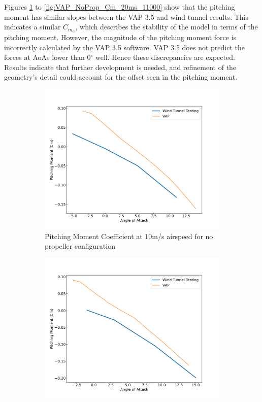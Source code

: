 Figures \ref{fig:VAP_NoProp_Cm_10ms_6000} to \ref{fig:VAP_NoProp_Cm_20ms_11000} show that the pitching moment has similar slopes between the VAP 3.5 and wind tunnel results. This indicates a similar $C_{m_{\alpha}}$, which describes the stability of the model in terms of the pitching moment. However, the magnitude of the pitching moment force is incorrectly calculated by the VAP 3.5 software. VAP 3.5 does not predict the forces at \acrshort{AoA}s lower than 0$^\circ$ well. Hence these discrepancies are expected. Results indicate that further development is needed, and refinement of the geometry's detail could account for the offset seen in the pitching moment. 


\begin{figure}[H]
    \centering
    \begin{subfigure}[b]{0.467\textwidth}
        \centering
        \includegraphics[width=\textwidth]{05_Results/VAP/noProp/Cm/10ms_6000RPM_Cm.png}
        \caption{Pitching Moment Coefficient at 10m/s airspeed for no propeller configuration}
        \label{fig:VAP_NoProp_Cm_10ms_6000}
    \end{subfigure}
    \begin{subfigure}[b]{0.467\textwidth}
        \centering
        \includegraphics[width=\textwidth]{05_Results/VAP/noProp/Cm/10ms_11000RPM_Cm.png}

\end{subfigure}
\end{figure}
